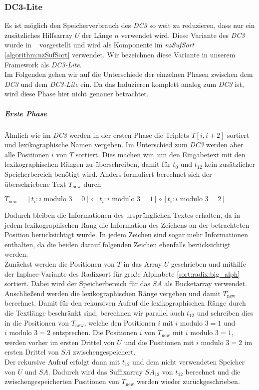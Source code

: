 \subsubsection{DC3-Lite}
\label{dc3:lite}


Es  ist möglich den Speicherverbrauch des \emph{DC3} so weit zu reduzieren, dass nur ein zusätzliches Hilfsarray $U$ der Länge $n$ verwendet wird. Diese Variante des \emph{DC3} wurde in ~\cite{saca:10} vorgestellt und wird als Komponente im \emph{nzSufSort} \cref{algorithm:nzSufSort} verwendet. Wir bezeichnen diese Variante in unserem Framework als \emph{DC3-Lite}. \\
Im Folgenden gehen wir auf die Unterschiede der einzelnen Phasen zwischen dem \emph{DC3} und dem \emph{DC3-Lite} ein. Da das Induzieren komplett analog zum \emph{DC3} ist, wird diese Phase hier nicht genauer betrachtet. 

\subparagraph*{Erste Phase}

Ähnlich wie im \emph{DC3} werden in der ersten Phase die Triplets $T[i,i+2]$ sortiert und lexikographische Namen vergeben. Im Unterschied zum \emph{DC3} werden aber alle Positionen $i$ von $T$ sortiert. Dies machen wir, um den Eingabetext mit den lexikographischen Rängen zu überschreiben, damit für $t_0$ und $t_{12}$ kein zusätzlicher Speicherbereich benötigt wird. Anders formuliert berechnet sich der überschriebene Text $T_{\text{new}}$ durch 
\begin{center}
	$T_{\text{new}} = [t_i : i \text{ modulo } 3 = 0] \circ [t_i : i \text{ modulo } 3 = 1] \circ [t_i : i \text{ modulo } 3 = 2]$ 
\end{center}
Dadurch bleiben die Informationen des ursprünglichen Textes erhalten, da in jedem lexikographischen Rang die Information des Zeichens an der betrachteten Position berücksichtigt wurde. In jedem Zeichen sind sogar mehr Informationen enthalten, da die beiden darauf folgenden Zeichen ebenfalls berücksichtigt werden. \\
Zunächst werden die Positionen von $T$ in das Array $U$ geschrieben und mithilfe der Inplace-Variante des Radixsort für große Alphabete \cref{sort:radix:big_alph} sortiert. Dabei wird der Speicherbereich für das $SA$ als Bucketarray verwendet. \\
Anschließend werden die lexikographischen Ränge vergeben und damit $T_{\text{new}}$ berechnet. Damit für den rekursiven Aufruf die lexikographischen Ränge durch die Textlänge beschränkt sind, berechnen wir parallel auch $t_{12}$ und schreiben dies in die Positionen von $T_{\text{new}}$, welche den Positionen $i$ mit $i \text{ modulo } 3 = 1$ und $i \text{ modulo } 3 = 2$ entsprechen. Die Positionen $i$ von $T_{\text{new}}$ mit $i \text{ modulo } 3 = 1$, werden vorher im ersten Drittel von $U$ und die Positionen mit $i \text{ modulo } 3 = 2$ im ersten Drittel von $SA$ zwischengespeichert. \\
Der rekursive Aufruf erfolgt dann mit $t_{12}$ und dem nicht verwendeten Speicher von $U$ und $SA$. Dadurch wird das Suffixarray $SA_{12}$ von $t_{12}$ berechnet und die zwischengespeicherten Positionen von $T_{\text{new}}$ werden wieder zurückgeschrieben.


